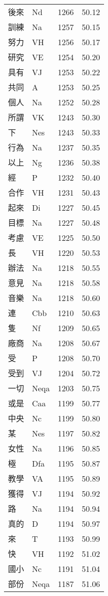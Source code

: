 \documentclass[twocolumn]{book}
\begin{document}
\begin{supertabular}{llrr}
後來 & Nd & 1266 &  50.12\\
訓練 & Na & 1257 &  50.15\\
努力 & VH & 1256 &  50.17\\
研究 & VE & 1254 &  50.20\\
具有 & VJ & 1253 &  50.22\\
共同 & A & 1253 &  50.25\\
個人 & Na & 1252 &  50.28\\
所謂 & VK & 1243 &  50.30\\
下 & Nes & 1243 &  50.33\\
行為 & Na & 1237 &  50.35\\
以上 & Ng & 1236 &  50.38\\
經 & P & 1232 &  50.40\\
合作 & VH & 1231 &  50.43\\
起來 & Di & 1227 &  50.45\\
目標 & Na & 1227 &  50.48\\
考慮 & VE & 1225 &  50.50\\
長 & VH & 1220 &  50.53\\
辦法 & Na & 1218 &  50.55\\
意見 & Na & 1218 &  50.58\\
音樂 & Na & 1218 &  50.60\\
連 & Cbb & 1210 &  50.63\\
隻 & Nf & 1209 &  50.65\\
廠商 & Na & 1208 &  50.67\\
受 & P & 1208 &  50.70\\
受到 & VJ & 1204 &  50.72\\
一切 & Neqa & 1203 &  50.75\\
或是 & Caa & 1199 &  50.77\\
中央 & Nc & 1199 &  50.80\\
某 & Nes & 1197 &  50.82\\
女性 & Na & 1196 &  50.85\\
極 & Dfa & 1195 &  50.87\\
教學 & VA & 1195 &  50.89\\
獲得 & VJ & 1194 &  50.92\\
路 & Na & 1194 &  50.94\\
真的 & D & 1194 &  50.97\\
來 & T & 1193 &  50.99\\
快 & VH & 1192 &  51.02\\
國小 & Nc & 1191 &  51.04\\
部份 & Neqa & 1187 &  51.06\\

\end{supertabular}
\end{document}
